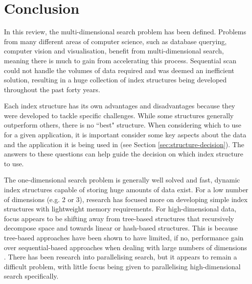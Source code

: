 \section{Conclusion}

In this review, the multi-dimensional search problem has been defined. Problems from many different areas of computer science, such as database querying, computer vision and visualisation, benefit from multi-dimensional search, meaning there is much to gain from accelerating this process. Sequential scan could not handle the volumes of data required and was deemed an inefficient solution, resulting in a huge collection of index structures being developed throughout the past forty years.

Each index structure has its own advantages and disadvantages because they were developed to tackle specific challenges. While some structures generally outperform others, there is no ``best" structure. When considering which to use for a given application, it is important consider some key aspects about the data and the application it is being used in (see Section \ref{sec:structure-decision}). The answers to these questions can help guide the decision on which index structure to use.

The one-dimensional search problem is generally well solved and fast, dynamic index structures capable of storing huge amounts of data exist. For a low number of dimensions (e.g. 2 or 3), research has focused more on developing simple index structures with lightweight memory requirements. For high-dimensional data, focus appears to be shifting away from tree-based structures that recursively decompose space and towards linear or hash-based structures. This is because tree-based approaches have been shown to have limited, if no, performance gain over sequential-based approaches when dealing with large numbers of dimensions \cite{md-structures-samet}. There has been research into parallelising search, but it appears to remain a difficult problem, with little focus being given to parallelising high-dimensional search specifically.